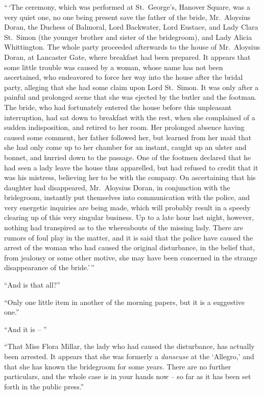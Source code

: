 “\,‘The ceremony, which was performed at St.\ George’s,
Hanover Square, was a very quiet one, no one being present
save the father of the bride, Mr.~Aloysius Doran, the Duchess
of Balmoral, Lord Backwater, Lord Eustace, and Lady Clara
St.~Simon (the younger brother and sister of the bridegroom),
and Lady Alicia Whittington. The whole party proceeded
afterwards to the house of Mr.~Aloysius Doran, at Lancaster
Gate, where breakfast had been prepared. It appears that
some little trouble was caused by a woman, whose name has
not been ascertained, who endeavored to force her way into
the house after the bridal party, alleging that she had some
claim upon Lord St.~Simon. It was only after a painful and
prolonged scene that she was ejected by the butler and the
footman. The bride, who had fortunately entered the house
before this unpleasant interruption, had sat down to breakfast
with the rest, when she complained of a sudden indisposition,
and retired to her room. Her prolonged absence having
caused some comment, her father followed her, but learned
from her maid that she had only come up to her chamber
for an instant, caught up an ulster and bonnet, and hurried
down to the passage. One of the footmen declared that he
had seen a lady leave the house thus apparelled, but had
refused to credit that it was his mistress, believing her to
be with the company. On ascertaining that his daughter
had disappeared, Mr.~Aloysius Doran, in conjunction with the
bridegroom, instantly put themselves into communication
with the police, and very energetic inquiries are being made,
which will probably result in a speedy clearing up of this very
singular business. Up to a late hour last night, however,
nothing had transpired as to the whereabouts of the missing
lady. There are rumors of foul play in the matter, and it is
said that the police have caused the arrest of the woman who
had caused the original disturbance, in the belief that, from
jealousy or some other motive, she may have been concerned
in the strange disappearance of the bride.’\,”

“And is that all?”

“Only one little item in another of the morning papers, but
it is a suggestive one.”

“And it is -- ”

“That Miss Flora Millar, the lady who had caused the disturbance,
has actually been arrested. It appears that she
was formerly a \textit{danseuse} at the ‘Allegro,’ and that she has
known the bridegroom for some years. There are no further
particulars, and the whole case is in your hands now -- so far
as it has been set forth in the public press.”

